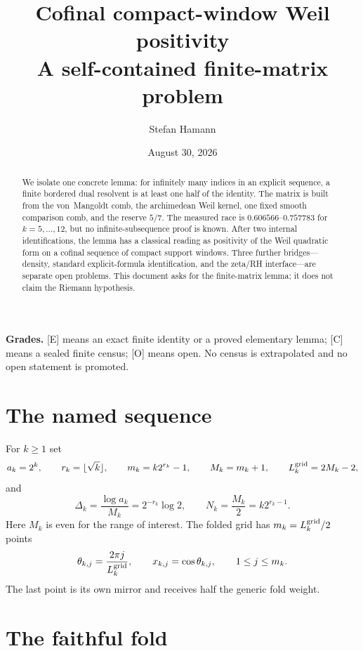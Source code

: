 \documentclass[11pt]{article}
\title{\bfseries Cofinal compact-window Weil positivity\\[2mm]
\large A self-contained finite-matrix problem}
\author{Stefan Hamann}
\date{August 30, 2026}
\newcommand{\Egrade}{\textnormal{\small[E]}}
\newcommand{\Cgrade}{\textnormal{\small[C]}}
\newcommand{\Ograde}{\textnormal{\small[O]}}
\begin{document}
\maketitle

\begin{abstract}\noindent
We isolate one concrete lemma: for infinitely many indices in an
explicit sequence, a finite bordered dual resolvent is at least
one half of the identity.  The matrix is built from the von~Mangoldt
comb, the archimedean Weil kernel, one fixed smooth comparison comb,
and the reserve $5/7$.  The measured race is
$0.606566$--$0.757783$ for $k=5,\ldots,12$, but no
infinite-subsequence proof is known.  After two internal
identifications, the lemma has a classical reading as positivity of
the Weil quadratic form on a cofinal sequence of compact support
windows.  Three further bridges---density, standard explicit-formula
identification, and the zeta/RH interface---are separate open
problems.  This document asks for the finite-matrix lemma; it does
not claim the Riemann hypothesis.
\end{abstract}

\medskip\noindent
\textbf{Grades.}\enspace
\Egrade{} means an exact finite identity or a proved elementary
lemma; \Cgrade{} means a sealed finite census; \Ograde{} means open.
No census is extrapolated and no open statement is promoted.

\section{The named sequence}

For $k\ge1$ set
\begin{equation}\label{eq:sequence}
 a_k=2^k,\qquad r_k=\lfloor\sqrt{k}\rfloor,\qquad
 m_k=k2^{r_k}-1,\qquad M_k=m_k+1,\qquad
 L_k^{\rm grid}=2M_k-2,
\end{equation}
and
\begin{equation}\label{eq:delta}
 \Delta_k=\frac{\log a_k}{M_k}=2^{-r_k}\log2,\qquad
 N_k=\frac{M_k}{2}=k2^{r_k-1}.
\end{equation}
Here $M_k$ is even for the range of interest.  The folded grid has
$m_k=L_k^{\rm grid}/2$ points
\[
 \theta_{k,j}=\frac{2\pi j}{L_k^{\rm grid}},\qquad
 x_{k,j}=\cos\theta_{k,j},\qquad 1\le j\le m_k .
\]
The last point is its own mirror and receives half the generic fold
weight.

\section{The faithful fold}
\end{document}
